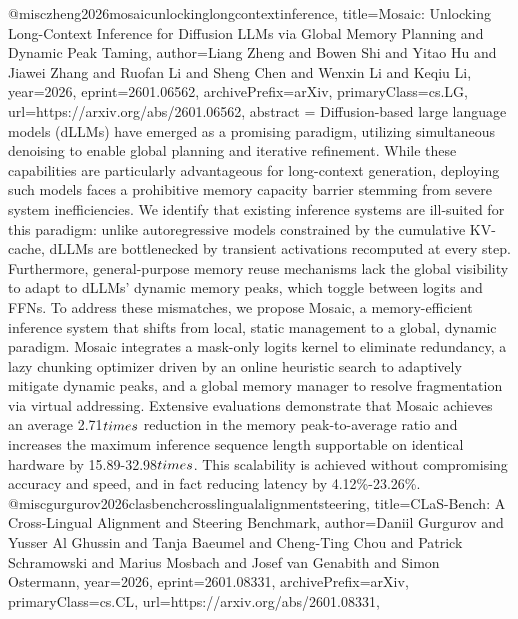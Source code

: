 {}@misc{zheng2026mosaicunlockinglongcontextinference,
      title={Mosaic: Unlocking Long-Context Inference for Diffusion LLMs via Global Memory Planning and Dynamic Peak Taming}, 
      author={Liang Zheng and Bowen Shi and Yitao Hu and Jiawei Zhang and Ruofan Li and Sheng Chen and Wenxin Li and Keqiu Li},
      year={2026},
      eprint={2601.06562},
      archivePrefix={arXiv},
      primaryClass={cs.LG},
      url={https://arxiv.org/abs/2601.06562},
      abstract = {Diffusion-based large language models (dLLMs) have emerged as a promising paradigm, utilizing simultaneous denoising to enable global planning and iterative refinement. While these capabilities are particularly advantageous for long-context generation, deploying such models faces a prohibitive memory capacity barrier stemming from severe system inefficiencies. We identify that existing inference systems are ill-suited for this paradigm: unlike autoregressive models constrained by the cumulative KV-cache, dLLMs are bottlenecked by transient activations recomputed at every step. Furthermore, general-purpose memory reuse mechanisms lack the global visibility to adapt to dLLMs' dynamic memory peaks, which toggle between logits and FFNs. To address these mismatches, we propose Mosaic, a memory-efficient inference system that shifts from local, static management to a global, dynamic paradigm. Mosaic integrates a mask-only logits kernel to eliminate redundancy, a lazy chunking optimizer driven by an online heuristic search to adaptively mitigate dynamic peaks, and a global memory manager to resolve fragmentation via virtual addressing. Extensive evaluations demonstrate that Mosaic achieves an average 2.71$\\times$ reduction in the memory peak-to-average ratio and increases the maximum inference sequence length supportable on identical hardware by 15.89-32.98$\\times$. This scalability is achieved without compromising accuracy and speed, and in fact reducing latency by 4.12\%-23.26\%.}
}@misc{gurgurov2026clasbenchcrosslingualalignmentsteering,
      title={CLaS-Bench: A Cross-Lingual Alignment and Steering Benchmark}, 
      author={Daniil Gurgurov and Yusser Al Ghussin and Tanja Baeumel and Cheng-Ting Chou and Patrick Schramowski and Marius Mosbach and Josef van Genabith and Simon Ostermann},
      year={2026},
      eprint={2601.08331},
      archivePrefix={arXiv},
      primaryClass={cs.CL},
      url={https://arxiv.org/abs/2601.08331},
}
